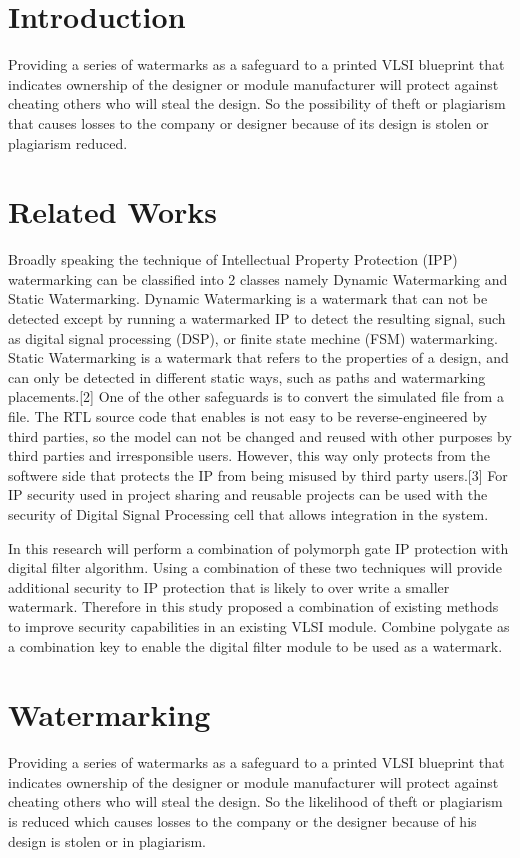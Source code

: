 \documentclass[10pt,journal,compsoc,letterpaper,final]{IEEEtran}
\begin{document}
	\section{Introduction}
	\label{sec:introduction}
\fi

Providing a series of watermarks as a safeguard to a printed VLSI blueprint that indicates ownership of the designer or module manufacturer will protect against cheating others who will steal the design. So the possibility of theft or plagiarism that causes losses to the company or designer because of its design is stolen or plagiarism reduced.\cite{IEEEhowto:kopka}

\section{Related Works}
Broadly speaking the technique of Intellectual Property Protection (IPP) watermarking can be classified into 2 classes namely Dynamic Watermarking and Static Watermarking. Dynamic Watermarking is a watermark that can not be detected except by running a watermarked IP to detect the resulting signal, such as digital signal processing (DSP), or finite state mechine (FSM) watermarking. Static Watermarking is a watermark that refers to the properties of a design, and can only be detected in different static ways, such as paths and watermarking placements.[2] One of the other safeguards is to convert the simulated file from a file. The RTL source code that enables is not easy to be reverse-engineered by third parties, so the model can not be changed and reused with other purposes by third parties and irresponsible users. However, this way only protects from the softwere side that protects the IP from being misused by third party users.[3] For IP security used in project sharing and reusable projects can be used with the security of Digital Signal Processing cell that allows integration in the system.

In this research will perform a combination of polymorph gate IP protection with digital filter algorithm. Using a combination of these two techniques will provide additional security to IP protection that is likely to over write a smaller watermark. Therefore in this study proposed a combination of existing methods to improve security capabilities in an existing VLSI module. Combine polygate as a combination key to enable the digital filter module to be used as a watermark.

\section{Watermarking}
Providing a series of watermarks as a safeguard to a printed VLSI blueprint that indicates ownership of the designer or module manufacturer will protect against cheating others who will steal the design. So the likelihood of theft or plagiarism is reduced which causes losses to the company or the designer because of his design is stolen or in plagiarism.
\end{document}
